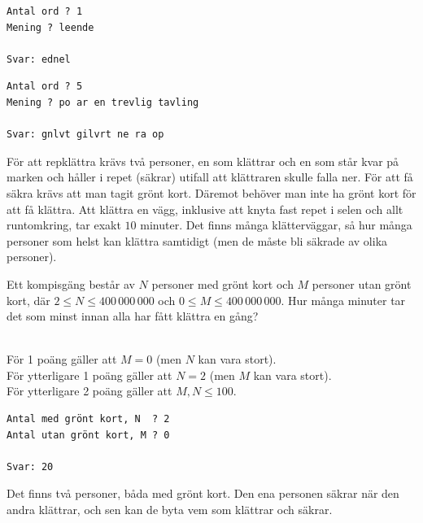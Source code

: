 \vspace{1cm}

\begin{verbatim}
Antal ord ? 1
Mening ? leende

Svar: ednel
\end{verbatim}

\vspace{1cm}

\begin{verbatim}
Antal ord ? 5
Mening ? po ar en trevlig tavling

Svar: gnlvt gilvrt ne ra op
\end{verbatim}


\newpage
{}

För att repklättra krävs två personer, en som klättrar och en som står kvar på marken och håller i repet (säkrar) utifall att klättraren skulle falla ner.
För att få säkra krävs att man tagit grönt kort.
Däremot behöver man inte ha grönt kort för att få klättra.
Att klättra en vägg, inklusive att knyta fast repet i selen och allt runtomkring, tar exakt $10$ minuter.
Det finns många klätterväggar, så hur många personer som helst kan klättra samtidigt (men de måste bli säkrade av olika personer).

Ett kompisgäng består av $N$ personer med grönt kort och $M$ personer utan grönt kort, där $2 \le N \le 400\,000\,000$ och $0 \le M \le 400\,000\,000$. Hur många minuter tar det som minst innan alla har fått klättra en gång?

\\
För 1 poäng gäller att $M = 0$ (men $N$ kan vara stort).\\
För ytterligare 1 poäng gäller att $N = 2$ (men $M$ kan vara stort).\\
För ytterligare 2 poäng gäller att $M,N \le 100$.


\vspace{0.5cm}

\begin{verbatim}
Antal med grönt kort, N  ? 2
Antal utan grönt kort, M ? 0

Svar: 20
\end{verbatim}

 Det finns två personer, båda med grönt kort.
Den ena personen säkrar när den andra klättrar, och sen kan de byta vem som klättrar och säkrar. 

\vspace{0.5cm}

